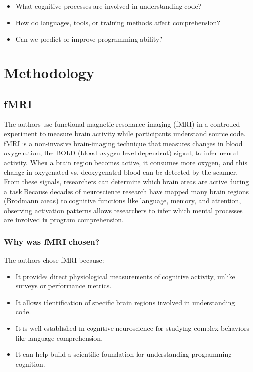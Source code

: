 \begin{itemize}
    \item What cognitive processes are involved in understanding code?
    \item How do languages, tools, or training methods affect comprehension?
    \item Can we predict or improve programming ability?
\end{itemize}

\section{Methodology}

\subsection{fMRI}

The authors use functional magnetic resonance imaging (fMRI) in a controlled experiment to measure brain activity while participants understand source code. fMRI is a non-invasive brain-imaging technique that measures changes in blood oxygenation, the BOLD (blood oxygen level dependent) signal, to infer neural activity. When a brain region becomes active, it consumes more oxygen, and this change in oxygenated vs. deoxygenated blood can be detected by the scanner. From these signals, researchers can determine which brain areas are active during a task.Because decades of neuroscience research have mapped many brain regions (Brodmann areas) to cognitive functions like language, memory, and attention, observing activation patterns allows researchers to infer which mental processes are involved in program comprehension.

\subsubsection{Why was fMRI chosen?}

The authors chose fMRI because:

\begin{itemize}
    \item It provides direct physiological measurements of cognitive activity, unlike surveys or performance metrics.
    \item It allows identification of specific brain regions involved in understanding code.
    \item It is well established in cognitive neuroscience for studying complex behaviors like language comprehension.
    \item It can help build a scientific foundation for understanding programming cognition.
\end{itemize}

